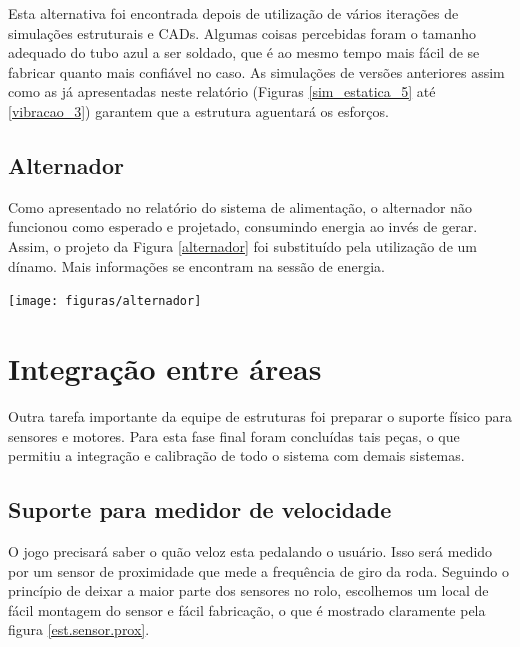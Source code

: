 
    Esta alternativa foi encontrada depois de utilização de vários iterações de simulações estruturais e CADs. Algumas coisas percebidas foram o tamanho adequado do tubo azul a ser soldado, que é ao mesmo tempo mais fácil de se fabricar quanto mais confiável no caso. As simulações de versões anteriores assim como as já apresentadas neste relatório (Figuras \ref{sim_estatica_5} até \ref{vibracao_3}) garantem que a estrutura aguentará os esforços.

\subsection{Alternador}
 
    Como apresentado no relatório do sistema de alimentação, o alternador não funcionou como esperado e projetado, consumindo energia ao invés de gerar. Assim, o projeto da Figura \ref{alternador} foi substituído pela utilização de um dínamo. Mais informações se encontram na sessão de energia.

    \begin{center}
    	\texttt{[image: figuras/alternador]}
        \label{alternador}
    \end{center} 
    
  \section{Integração entre áreas} \label{secao.integracao}
	
	Outra tarefa importante da equipe de estruturas foi preparar o suporte físico para sensores e motores. Para esta fase final foram concluídas tais peças, o que permitiu a integração e calibração de todo o sistema com demais sistemas.   
  
  \subsection{Suporte para medidor de velocidade}
  
  O jogo precisará saber o quão veloz esta pedalando o usuário. Isso será medido por um sensor de proximidade que mede a frequência de giro da roda. Seguindo o princípio de deixar a maior parte dos sensores no rolo, escolhemos um local de fácil montagem do sensor e fácil fabricação, o que é mostrado claramente pela figura \ref{est.sensor.prox}.
  
